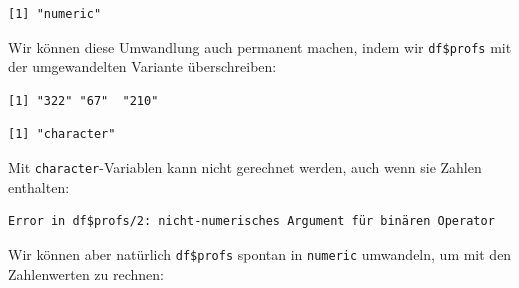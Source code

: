 \documentclass[
  letterpaper,
  DIV=11,
  numbers=noendperiod]{scrreprt}
\newenvironment{Shaded}{\begin{snugshade}}{\end{snugshade}}
\newcommand{\DecValTok}[1]{\textcolor[rgb]{0.68,0.00,0.00}{#1}}
\newcommand{\FunctionTok}[1]{\textcolor[rgb]{0.28,0.35,0.67}{#1}}
\newcommand{\NormalTok}[1]{\textcolor[rgb]{0.00,0.46,0.62}{#1}}
\newcommand{\OtherTok}[1]{\textcolor[rgb]{0.00,0.46,0.62}{#1}}
\newcommand{\SpecialCharTok}[1]{\textcolor[rgb]{0.37,0.37,0.37}{#1}}
\begin{document}
\begin{verbatim}
[1] "numeric"
\end{verbatim}

Wir können diese Umwandlung auch permanent machen, indem wir
\texttt{df\$profs} mit der umgewandelten Variante überschreiben:

\begin{Shaded}
\end{Shaded}

\begin{verbatim}
[1] "322" "67"  "210"
\end{verbatim}

\begin{Shaded}
\end{Shaded}

\begin{verbatim}
[1] "character"
\end{verbatim}

Mit \texttt{character}-Variablen kann nicht gerechnet werden, auch wenn
sie Zahlen enthalten:

\begin{Shaded}
\end{Shaded}

\begin{verbatim}
Error in df$profs/2: nicht-numerisches Argument für binären Operator
\end{verbatim}

Wir können aber natürlich \texttt{df\$profs} spontan in \texttt{numeric}
umwandeln, um mit den Zahlenwerten zu rechnen:

\begin{Shaded}
\end{Shaded}
\end{document}
